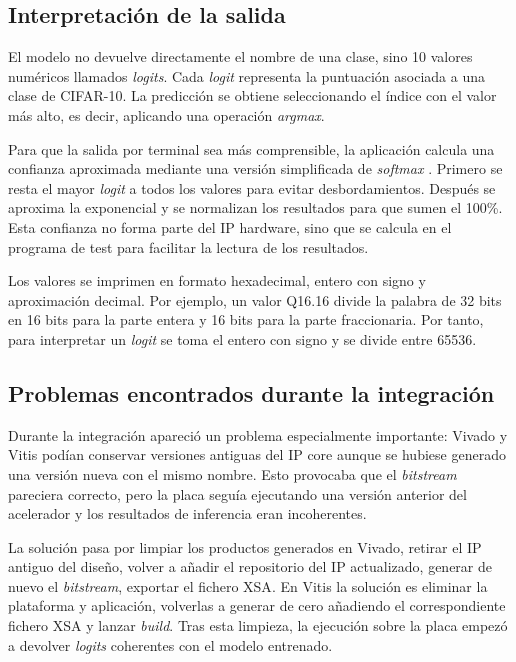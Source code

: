\subsection{Interpretación de la salida}
El modelo no devuelve directamente el nombre de una clase, sino 10 valores numéricos llamados
\textit{logits}. Cada \textit{logit} representa la puntuación asociada a una clase de \ac{CIFAR}-10.
La predicción se obtiene seleccionando el índice con el valor más alto, es decir,
aplicando una operación \textit{argmax}.

Para que la salida por terminal sea más comprensible, la aplicación calcula una confianza
aproximada mediante una versión simplificada de \textit{softmax}
\citep{pmlr-v70-guo17a}. Primero se resta el
mayor \textit{logit} a todos los valores para evitar desbordamientos. Después se aproxima la
exponencial y se normalizan los resultados para que sumen el 100\%. Esta confianza no
forma parte del \ac{IP} hardware, sino que se calcula en el programa de test para facilitar la
lectura de los resultados.

Los valores se imprimen en formato hexadecimal, entero con signo y aproximación decimal.
Por ejemplo, un valor Q16.16 divide la palabra de 32 bits en 16 bits para la parte entera
y 16 bits para la parte fraccionaria. Por tanto, para interpretar un \textit{logit} se toma el
entero con signo y se divide entre 65536.

\subsection{Problemas encontrados durante la integración}
Durante la integración apareció un problema especialmente importante: Vivado y Vitis
podían conservar versiones antiguas del \ac{IP} core aunque se hubiese generado una versión
nueva con el mismo nombre. Esto provocaba que el \textit{bitstream} pareciera correcto, pero la
placa seguía ejecutando una versión anterior del acelerador y los resultados de
inferencia eran incoherentes.

La solución pasa por limpiar los productos generados en Vivado, retirar el \ac{IP}
antiguo del diseño,
volver a añadir el repositorio del \ac{IP} actualizado, generar de nuevo el \textit{bitstream},
exportar el fichero \ac{XSA}.
En Vitis la solución es eliminar la plataforma y aplicación, volverlas a generar de
cero añadiendo el correspondiente fichero \ac{XSA} y lanzar \textit{build}.
Tras esta limpieza, la ejecución sobre la placa empezó a devolver \textit{logits}
coherentes con el modelo entrenado.

